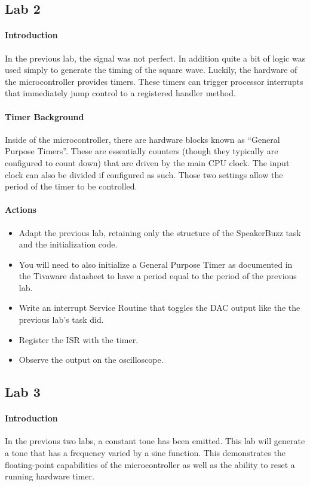 \documentclass[titlepage]{article}
\begin{document}
\subsection{Lab 2}
\paragraph{Introduction}
In the previous lab, the signal was not perfect. In addition quite a bit of logic was used 
simply to generate the timing of the square wave. Luckily, the hardware of the microcontroller 
provides timers. These timers can trigger processor interrupts that immediately jump control to 
a registered handler method.

\paragraph{Timer Background}
Inside of the microcontroller, there are hardware blocks known as ``General Purpose Timers''. 
These are essentially counters (though they typically are configured to count down) that are driven 
by the main CPU clock. The input clock can also be divided if configured as such. Those two settings 
allow the period of the timer to be controlled.

\paragraph{Actions}
\begin{itemize}
    \item Adapt the previous lab, retaining only the structure of the SpeakerBuzz task and the initialization
     code.
    \item You will need to also initialize a General Purpose Timer as documented in the Tivaware datasheet to 
    have a period equal to the period of the previous lab.
    \item Write an interrupt Service Routine that toggles the DAC output like the 
    the previous lab's task did.
    \item Register the ISR with the timer.
    \item Observe the output on the oscilloscope.
\end{itemize}
\pagebreak

\subsection{Lab 3}
\paragraph{Introduction}
In the previous two labs, a constant tone has been emitted. This lab will generate a tone that has 
a frequency varied by a sine function. This demonstrates the floating-point capabilities of the 
microcontroller as well as the ability to reset a running hardware timer.
\end{document}
